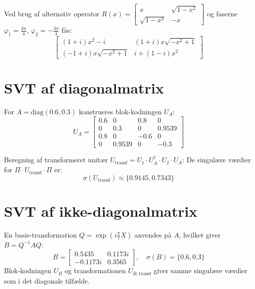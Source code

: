 \documentclass[11pt,a4paper]{article}
\begin{document}
Ved brug af alternativ operator $R(x) = \begin{bmatrix} x & \sqrt{1-x^2} \\ \sqrt{1-x^2} & -x \end{bmatrix}$ og faserne $\varphi_1 = \frac{3\pi}{4}$, $\varphi_2 = -\frac{3\pi}{4}$ fås:
\begin{equation}
\begin{bmatrix}
(1+i)x^2 - i & (1+i)x\sqrt{-x^2+1} \\
(-1+i)x\sqrt{-x^2+1} & i + (1-i)x^2
\end{bmatrix}
\end{equation}

\section{SVT af diagonalmatrix}
For $A = \text{diag}(0.6, 0.3)$ konstrueres blok-kodningen $U_A$:
\begin{equation}
U_A = \begin{bmatrix} 
 0.6 & 0 &  0.8 &  0 \\ 
 0 &  0.3 &  0 &  0.9539 \\ 
 0.8 &  0 & -0.6 & 0 \\ 
 0 &  0.9539 & 0 & -0.3 
\end{bmatrix}
\end{equation}

Beregning af transformeret unitær $U_{\text{transf}} = U_1 \cdot U_A^\dagger \cdot U_2 \cdot U_A$:
De singulære værdier for $\Pi \cdot U_{\text{transf}} \cdot \Pi$ er:
\begin{equation}
\sigma(U_{\text{transf}}) \approx \{0.9145, 0.7343\}
\end{equation}

\section{SVT af ikke-diagonalmatrix}
En basis-transformation $Q = \exp(i \frac{\pi}{7} X)$ anvendes på $A$, hvilket giver $B = Q^{-1} A Q$:
\begin{equation}
B = \begin{bmatrix} 0.5435 & 0.1173i \\ -0.1173i & 0.3565 \end{bmatrix}, \quad \sigma(B) = \{0.6, 0.3\}
\end{equation}
Blok-kodningen $U_B$ og transformationen $U_{B,\text{transf}}$ giver samme singulære værdier som i det diagonale tilfælde.
\end{document}
